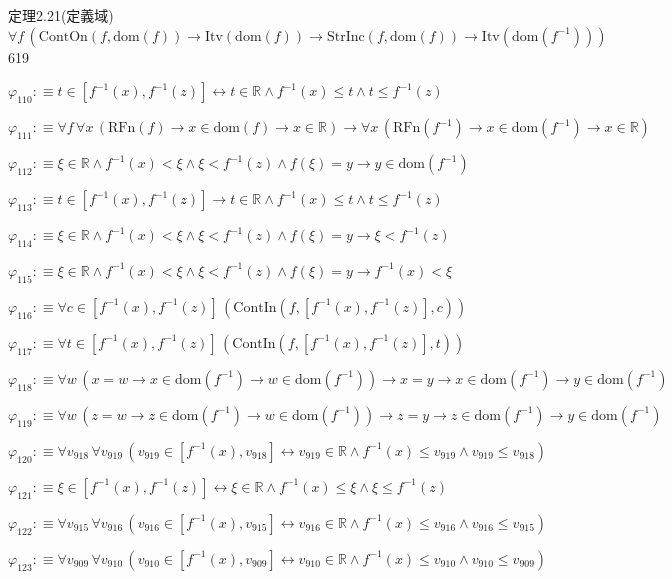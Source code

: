 \begin{fullproof}{定理2.21(定義域)}{$\forall f\,(\mathrm{ContOn}(f,\mathrm{dom}(f)) \to \mathrm{Itv}(\mathrm{dom}(f)) \to \mathrm{StrInc}(f,\mathrm{dom}(f)) \to \mathrm{Itv}(\mathrm{dom}(f^{-1})))$}{619}
\begin{abbrevlist}
\item $\varphi_{110} :\equiv t \in [f^{-1}(x),f^{-1}(z)] \leftrightarrow t \in \mathbb{R} \land f^{-1}(x) \leq t \land t \leq f^{-1}(z)$
\item $\varphi_{111} :\equiv \forall f\,\forall x\,(\mathrm{RFn}(f) \to x \in \mathrm{dom}(f) \to x \in \mathbb{R}) \to \forall x\,(\mathrm{RFn}(f^{-1}) \to x \in \mathrm{dom}(f^{-1}) \to x \in \mathbb{R})$
\item $\varphi_{112} :\equiv \xi \in \mathbb{R} \land f^{-1}(x) < \xi \land \xi < f^{-1}(z) \land f(\xi) = y \to y \in \mathrm{dom}(f^{-1})$
\item $\varphi_{113} :\equiv t \in [f^{-1}(x),f^{-1}(z)] \to t \in \mathbb{R} \land f^{-1}(x) \leq t \land t \leq f^{-1}(z)$
\item $\varphi_{114} :\equiv \xi \in \mathbb{R} \land f^{-1}(x) < \xi \land \xi < f^{-1}(z) \land f(\xi) = y \to \xi < f^{-1}(z)$
\item $\varphi_{115} :\equiv \xi \in \mathbb{R} \land f^{-1}(x) < \xi \land \xi < f^{-1}(z) \land f(\xi) = y \to f^{-1}(x) < \xi$
\item $\varphi_{116} :\equiv \forall c \in [f^{-1}(x),f^{-1}(z)]\,(\mathrm{ContIn}(f,[f^{-1}(x),f^{-1}(z)],c))$
\item $\varphi_{117} :\equiv \forall t \in [f^{-1}(x),f^{-1}(z)]\,(\mathrm{ContIn}(f,[f^{-1}(x),f^{-1}(z)],t))$
\item $\varphi_{118} :\equiv \forall w\,(x = w \to x \in \mathrm{dom}(f^{-1}) \to w \in \mathrm{dom}(f^{-1})) \to x = y \to x \in \mathrm{dom}(f^{-1}) \to y \in \mathrm{dom}(f^{-1})$
\item $\varphi_{119} :\equiv \forall w\,(z = w \to z \in \mathrm{dom}(f^{-1}) \to w \in \mathrm{dom}(f^{-1})) \to z = y \to z \in \mathrm{dom}(f^{-1}) \to y \in \mathrm{dom}(f^{-1})$
\item $\varphi_{120} :\equiv \forall v_{918}\,\forall v_{919}\,(v_{919} \in [f^{-1}(x),v_{918}] \leftrightarrow v_{919} \in \mathbb{R} \land f^{-1}(x) \leq v_{919} \land v_{919} \leq v_{918})$
\item $\varphi_{121} :\equiv \xi \in [f^{-1}(x),f^{-1}(z)] \leftrightarrow \xi \in \mathbb{R} \land f^{-1}(x) \leq \xi \land \xi \leq f^{-1}(z)$
\item $\varphi_{122} :\equiv \forall v_{915}\,\forall v_{916}\,(v_{916} \in [f^{-1}(x),v_{915}] \leftrightarrow v_{916} \in \mathbb{R} \land f^{-1}(x) \leq v_{916} \land v_{916} \leq v_{915})$
\item $\varphi_{123} :\equiv \forall v_{909}\,\forall v_{910}\,(v_{910} \in [f^{-1}(x),v_{909}] \leftrightarrow v_{910} \in \mathbb{R} \land f^{-1}(x) \leq v_{910} \land v_{910} \leq v_{909})$

\end{abbrevlist}
\end{fullproof}
